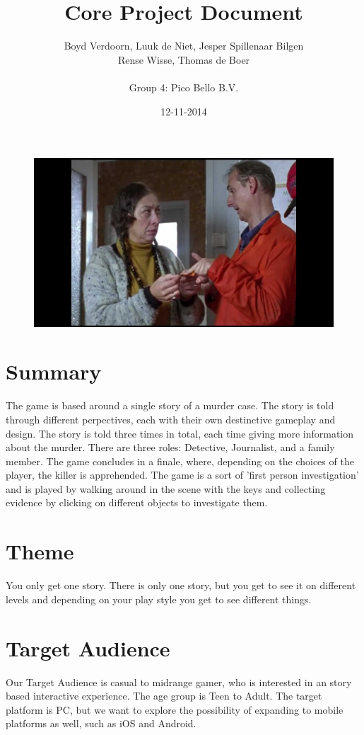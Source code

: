 \documentclass{article}
\title{Core Project Document}
\author{Boyd Verdoorn, Luuk de Niet, Jesper Spillenaar Bilgen\\ Rense Wisse, Thomas de Boer\\ \\Group 4: Pico Bello B.V.}
\date{12-11-2014}
\begin{document}
	\maketitle
	\begin{figure}[ht!]
		\centering
		\includegraphics[width=120mm]{Front.jpg}
	\end{figure}
	\newpage

	\section{Summary}
		The game is based around a single story of a murder case. The story is told through different perpectives, each with their own destinctive gameplay and design. The story is told three times in total, each time giving more information about the murder. There are three roles: Detective, Journalist, and a family member. The game concludes in a finale, where, depending on the choices of the player, the killer is apprehended. The game is a sort of 'first person investigation' and is played by walking around in the scene with the keys and collecting evidence by clicking on different objects to investigate them.

	\section{Theme}
		You only get one story.
		There is only one story, but you get to see it on different levels and depending on your play style you get to see different things.

	\section{Target Audience}
		Our Target Audience is casual to midrange gamer, who is interested in an story based interactive experience. The age group is Teen to Adult. The target platform is PC, but we want to explore the possibility of expanding to mobile platforms as well, such as iOS and Android.
\end{document}
